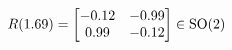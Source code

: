 \documentclass[preview]{standalone}
\begin{document}
\begin{align*}
\special{dvisvgm:raw <g id='unique000'>}R(1.69) = \begin{bmatrix} -0.12 & -0.99 \\ 0.99 & -0.12 \end{bmatrix} \in \text{SO}(2)\special{dvisvgm:raw </g>}
\end{align*}
\end{document}
